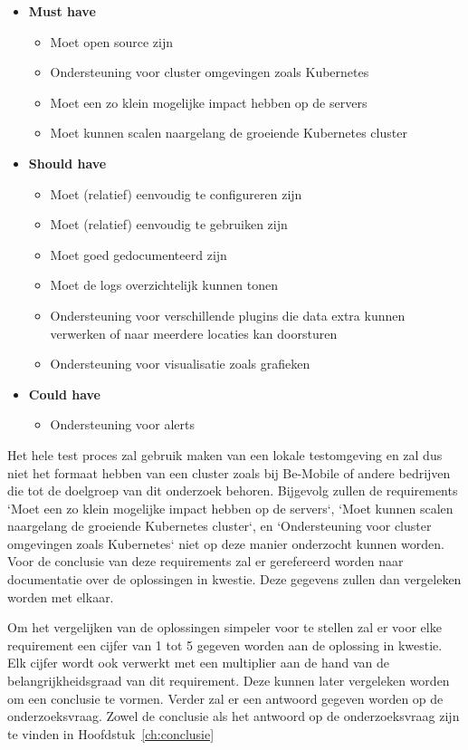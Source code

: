 \begin{itemize}
    \item \textbf{Must have}
    \begin{itemize}
        \item Moet open source zijn
        \item Ondersteuning voor cluster omgevingen zoals Kubernetes
        \item Moet een zo klein mogelijke impact hebben op de servers
        \item Moet kunnen scalen naargelang de groeiende Kubernetes cluster
    \end{itemize}
    \item \textbf{Should have}
    \begin{itemize}
        \item Moet (relatief) eenvoudig te configureren zijn
        \item Moet (relatief) eenvoudig te gebruiken zijn
        \item Moet goed gedocumenteerd zijn
        \item Moet de logs overzichtelijk kunnen tonen
        \item Ondersteuning voor verschillende plugins die data extra kunnen verwerken of naar meerdere locaties kan doorsturen
         \item Ondersteuning voor visualisatie zoals grafieken
    \end{itemize}
    \item \textbf{Could have}
    \begin{itemize}
       \item Ondersteuning voor alerts
    \end{itemize}
\end{itemize}

Het hele test proces zal gebruik maken van een lokale testomgeving en zal dus niet het formaat hebben van een cluster zoals bij Be-Mobile of andere bedrijven die tot de doelgroep van dit onderzoek behoren. Bijgevolg zullen de requirements `Moet een zo klein mogelijke impact hebben op de servers`, `Moet kunnen scalen naargelang de groeiende Kubernetes cluster`, en `Ondersteuning voor cluster omgevingen zoals Kubernetes` niet op deze manier onderzocht kunnen worden. Voor de conclusie van deze requirements zal er gerefereerd worden naar documentatie over de oplossingen in kwestie. Deze gegevens zullen dan vergeleken worden met elkaar. 

Om het vergelijken van de oplossingen simpeler voor te stellen zal er voor elke requirement een cijfer van 1 tot 5 gegeven worden aan de oplossing in kwestie. Elk cijfer wordt ook verwerkt met een multiplier aan de hand van de belangrijkheidsgraad van dit requirement. Deze kunnen later vergeleken worden om een conclusie te vormen. Verder zal er een antwoord gegeven worden op de onderzoeksvraag. Zowel de conclusie als het antwoord op de onderzoeksvraag zijn te vinden in Hoofdstuk~\ref{ch:conclusie}












